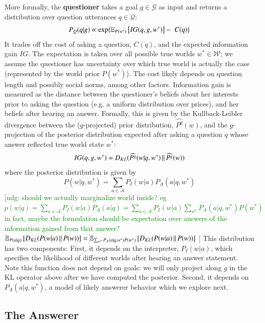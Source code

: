 \documentclass[12pt, floatsintext, jou]{apa6}
\newcommand{\ndg}[1]{\textcolor{Green}{[ndg: #1]}}
\begin{document}
More formally, the \textbf{questioner} takes a goal $g \in \mathcal{G}$ as input and returns a distribution over question utterances $q \in \mathcal{Q}$:
%
$$ 
P_{Q}(q|g)  \propto \exp\{\mathbb{E}_{P(w^*)}\left [IG(q,g,w^*) \right] - \,\,C(q)\}
$$
%
It trades off the cost of asking a question, $C(q)$, and the expected information gain $IG$. The expectation is taken over all possible true worlds $w^* \in \mathcal{W}$; we assume the questioner has uncertainty over which true world is actually the case (represented by the world prior $P(w^*)$). The cost likely depends on question length and possibly social norms, among other factors. Information gain is measured as the distance between the questioner's beliefs about her interests prior to asking the question (e.g. a uniform distribution over prices), and her beliefs after hearing an answer. Formally, this is given by the Kullback-Leibler divergence between the ($g$-projected) prior distribution, $\widehat{P^g}(w)$, and the $g$-projection of the posterior distribution expected after asking a question $q$ whose answer reflected true world state $w^*$:
%
$$IG(q,g,w^*) = D_{KL}({\widehat{P^g}(w|q, w^*)}\, \| \, {\widehat{P^g}(w)})$$
where the posterior distribution is given by
$$P(w|q, w^*) = \sum_{a \in \mathcal{A}} P_I(w | a) P_{A}(a| q, w^*)$$
\ndg{should we actually marginalize world inside? eg $p(w|q) = \sum_{a \in \mathcal{A}} P_I(w | a) P_{A}(a | q) =  \sum_{a \in \mathcal{A}} P_I(w | a) \sum_{w^*} P_{A}(a | q, w^*)P(w^*)$
in fact, maybe the formulation should be expectation over answers of the information gained from that answer?
$\mathbb{E}_{P(a|q)}\left [ D_{KL}({P(w|a)}\, \| \, {P(w)})  \right] = \mathbb{E}_{\sum_{w^*} P_{A}(a | q, w^*)P(w^*)}\left [ D_{KL}({P(w|a)}\, \| \, {P(w)})  \right] $ 
}
%
This distribution has two components: 
First, it depends on the interpreter, $P_I(w | a)$, which specifies the likelihood of different worlds after hearing an answer statement. Note this function does not depend on goals: we will only project along $g$ in the KL operator above after we have computed the posterior. Second, it depends on $P_{A}(a | q, w^*)$, a model of likely answerer behavior which we explore next.

\subsection{The Answerer}
\end{document}
